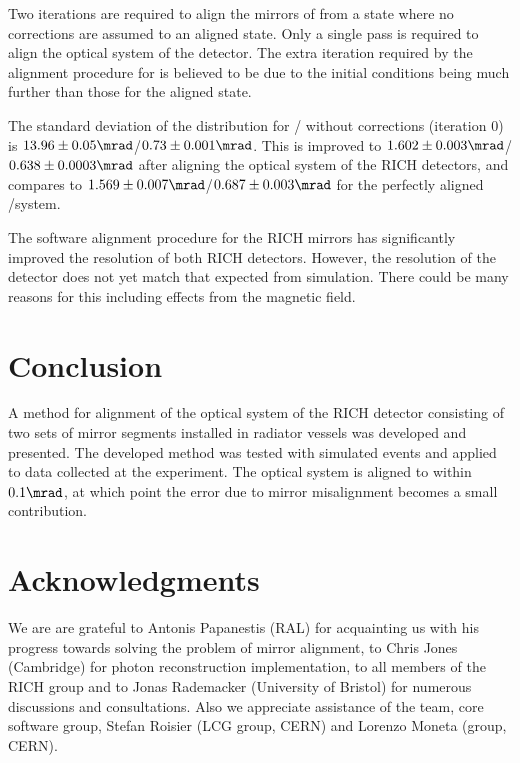 Two iterations are required to align the mirrors of \richone from a state where
no corrections are assumed to an aligned state. Only a single pass is required
to align the optical system of the \richtwo detector. The extra iteration
required by the alignment procedure for \richone is believed to be due to the
initial conditions being much further than those for the aligned state.

The standard deviation of the \deltatheta distribution for \richone/\richtwo
without corrections (iteration 0) is $13.96\pm 0.05\mrad$/$0.73\pm
0.001\mrad$. This is improved to $1.602\pm 0.003\mrad$/$0.638\pm 0.0003\mrad$
after aligning the optical system of the RICH detectors, and compares to
$1.569\pm 0.007\mrad$/$0.687\pm 0.003\mrad$ for the perfectly aligned
\richone/\richtwo system.

The software alignment procedure for the \lhcb RICH mirrors has significantly
improved the resolution of both RICH detectors. However, the resolution  of the
\richone detector does not yet match that expected from simulation. There could
be many reasons for this including effects from the magnetic field.


\section{Conclusion} \label{sec:conclusions}

A method for alignment of the optical system of the \lhcb RICH detector
consisting of two sets of mirror segments installed in radiator vessels was
developed and presented. The developed method was tested with simulated events
and applied to data collected at the \lhcb experiment. The optical system is
aligned to within $0.1\mrad$, at which point the error due to mirror
misalignment becomes a small contribution.


\section{Acknowledgments} \label{sec:acknowledgments}

We are are grateful to Antonis Papanestis (RAL) for acquainting us with his
progress towards solving the problem of mirror alignment, to Chris Jones
(Cambridge) for photon reconstruction implementation, to all members of the
\lhcb RICH group and to Jonas Rademacker (University of Bristol) for numerous
discussions and consultations. Also we appreciate assistance of the \ganga team,
\lhcb core software group, Stefan Roisier (LCG group, CERN) and Lorenzo Moneta
(\root group, CERN).
